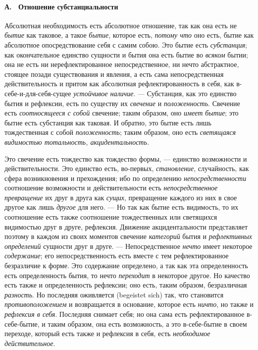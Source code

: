 \paragraph[А. \ Отношение субстанциальности]{А. \ Отношение
субстанциальности}
\hypertarget{Toc478978769}{}Абсолютная необходимость есть абсолютное
отношение, так как она есть не {\em бытие} как таковое,
а такое {\em бытие}, которое есть,
{\em потому что} оно есть, бытие как абсолютное
опосредствование себя с самим собою. Это бытие есть
{\em субстанция}; как окончательное единство сущности и
бытия она есть бытие во {\em всяком} бытии; она не есть
ни нерефлектированное непосредственное, ни нечто абстрактное, стоящее
позади существования и явления, а есть сама непосредственная
действительность и притом как абсолютная рефлектированность в себя, как
в-себе-и-для-себя-сущее {\em устойчивое наличие}. —
Субстанция, как это единство бытия и рефлексии, есть по существу их
{\em свечение} и
{\em положенность}. Свечение есть
{\em соотносящееся с собой} свечение; таким образом,
оно {\em имеет бытие}; это бытие есть субстанция как
таковая. И обратно, это бытие есть лишь тождественная с собой
{\em положенность}; таким образом, оно есть
{\em светящаяся видимостью тотальность,
акцидентальность.}

Это свечение есть тождество как тождество формы, — единство возможности и
действительности. Это единство есть, во-первых,
{\em становление}, случайность, как сфера возникновения
и прехождения; ибо по определению
{\em непосредственности} соотношение возможности и
действительности есть {\em непосредственное
превращение} их друг в друга как {\em сущих},
превращение каждого из них в свое другое как лишь
{\em другое} для него. — Но так как бытие есть
видимость, то их соотношение есть также соотношение тождественных или
светящихся видимостью друг в друге, рефлексия. Движение акцидентальности
представляет поэтому в каждом из своих моментов свечение
{\em категорий} бытия и
{\em рефлективных определений} сущности друг в друге. —
Непосредственное {\em нечто} имеет некоторое
{\em содержание}; его непосредственность есть вместе с
тем рефлектированное безразличие к форме. Это содержание определено, а так
как эта определенность есть определенность бытия, то нечто
{\em переходит} в некоторое другое. Но качество есть
также и определенность рефлексии; оно есть, таким образом, безразличная
{\em разность}. Но последняя оживляется (begeistet
sich) так, что становится {\em противоположением} и
возвращается в основание, которое есть {\em ничто}, но
также и {\em рефлексия в себя}. Последняя снимает себя;
но она сама есть рефлектированное в-себе-бытие, и таким образом, она есть
возможность, а это в-себе-бытие в своем переходе, который есть также и
рефлексия в себя, есть {\em необходимое
действительное}.

